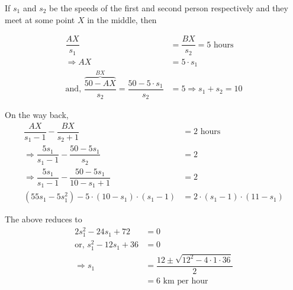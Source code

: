 \begin{solution}[\fullpage]
	If $s_1$ and $s_2$ be the speeds of the first and second person respectively and they
	meet at some point $X$ in the middle, then 
	
	\begin{align}
		\dfrac{AX}{s_1} &= \dfrac{BX}{s_2} = 5\text{ hours} \\
		\Rightarrow AX &= 5\cdot s_1 \\
		\text{and, } \dfrac{\overbrace{50-AX}^{BX}}{s_2} = \dfrac{50-5\cdot s_1}{s_2} &= 5 \Rightarrow s_1 + s_2 = 10
	\end{align}
	
	On the way back, 
	\begin{align}
		\dfrac{AX}{s_1 - 1} - \dfrac{BX}{s_2 + 1} &= 2\text{ hours} \\
		\Rightarrow \dfrac{5s_1}{s_1 - 1} - \dfrac{50 - 5s_1}{s_2} &= 2 \\
		\Rightarrow \dfrac{5s_1}{s_1 - 1} - \dfrac{50 - 5s_1}{10-s_1+1} &= 2 \\
		(55s_1 - 5s_1^2) - 5\cdot(10-s_1)\cdot(s_1-1) &= 2\cdot(s_1-1)\cdot(11-s_1)
	\end{align}
	
	The above reduces to 
	\begin{align}
		2s_1^2 - 24s_1 + 72 &= 0 \\
		\text{or, }s_1^2 -12s_1 + 36 &= 0 \\
		\Rightarrow s_1 &= \dfrac{12\pm\sqrt{12^2 - 4\cdot 1 \cdot 36}}{2} \\
		                &= 6\text{ km per hour}
	\end{align}
	
\end{solution}

